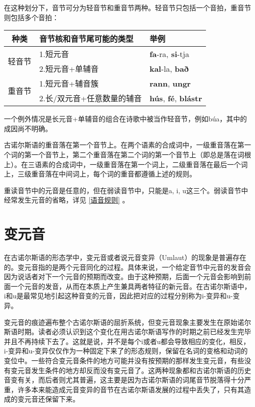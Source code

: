 在这种划分下，音节可分为轻音节和重音节两种。轻音节只包括一个音拍，重音节则包括多个音拍：


\begin{table}[H]
  \centering
  \begin{tabular}{cll}
    \toprule
    \textbf{种类}          & \textbf{音节核和音节尾可能的类型} & \textbf{举例}                                 \\ \midrule
    \multirow{2}{*}{轻音节} & 1.短元音                 & \textbf{fa}-ra, \textbf{si}-tja             \\
                         & 2.短元音+单辅音             & \textbf{kal}-la, \textbf{bað}               \\[1ex]
    \multirow{2}{*}{重音节} & 1.短元音+辅音簇             & \textbf{rann}, \textbf{ungr}                \\
                         & 2.长/双元音+任意数量的辅音       & \textbf{hús}, \textbf{fé},  \textbf{blástr} \\ \bottomrule
  \end{tabular}
\end{table}

一个例外情况是长元音+单辅音的组合在诗歌中被当作轻音节，例如búa，其中的成因尚不明确。

古诺尔斯语的重音落在第一个音节上。在两个语素的合成词中，一级重音落在第一个词的第一个音节上，第二个重音落在第二个词的第一个音节上（即总是落在词根上）。在三语素的合成词中，一级重音落在第一个词上，二级重音落在最后一个词上，三级重音落在中间词上，每个词的重音都遵循上述的规则。

重读音节中的元音是任意的，但在弱读音节中，只能是a, i, u这三个。弱读音节中经常发生元音的省略，详见 \ref{语音规则} 。

\section{变元音}
\label{变元音}

在古诺尔斯语的形态学中，变元音或者说元音变异（Umlaut）的现象是普遍存在的。变元音指的是两个元音同化的过程。具体来说，一个给定音节中元音的发音会因为说话者对下一个元音的预期而改变。由于这种预期，后面一个元音会影响到前面一个元音的发音，从而在本质上产生兼具两者特征的新元音。在古诺尔斯语中，i和u是最常见地引起这种音变的元音，因此把对应的过程分别称为i-变异和u-变异。

变元音的痕迹遍布整个古诺尔斯语的屈折系统，但变元音现象主要发生在原始诺尔斯语时期。读者必须认识到这个变化在用古诺尔斯语写作的时期之前已经发生完毕并且不再持续下去了。这就是说，并不是每个i或者u都会导致相应的变化，相反，i-变异和u-变异仅仅作为一种固定下来了的形态规则，保留在\textbf{}名词的变格和动词的变位中。一些符合变元音条件的地方可能并没有按预期的那样发生变元音，有些没有变元音发生条件的地方却反而没有变元音了。这两种现象都和古诺尔斯语的历史音变有关，而后者则尤其普遍，这主要是因为古诺尔斯语的词尾音节脱落得十分严重，许多本来能造成元音变异的音节在古诺尔斯语发展的过程中丢失了，只有其造成的变元音还保留下来。

